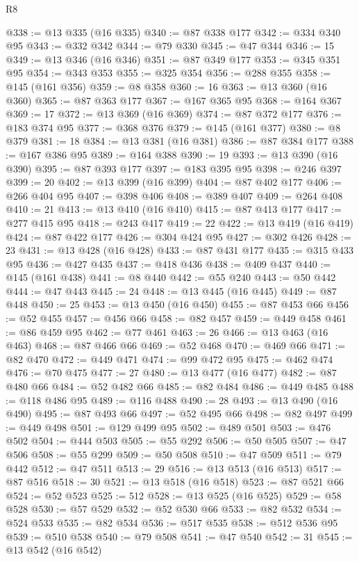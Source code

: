 \begin{lexlean}{R8}
\begin{coremodule}
@338 := @13 @335 (@16 @335)
@340 := @87 @338 @177
@342 := @334 @340 @95
@343 := @332 @342
@344 := @79 @330
@345 := @47 @344
@346 := 15
@349 := @13 @346 (@16 @346)
@351 := @87 @349 @177
@353 := @345 @351 @95
@354 := @343 @353
@355 := @325 @354
@356 := @288 @355
@358 := @145 (@161 @356)
@359 := @8 @358
@360 := 16
@363 := @13 @360 (@16 @360)
@365 := @87 @363 @177
@367 := @167 @365 @95
@368 := @164 @367
@369 := 17
@372 := @13 @369 (@16 @369)
@374 := @87 @372 @177
@376 := @183 @374 @95
@377 := @368 @376
@379 := @145 (@161 @377)
@380 := @8 @379
@381 := 18
@384 := @13 @381 (@16 @381)
@386 := @87 @384 @177
@388 := @167 @386 @95
@389 := @164 @388
@390 := 19
@393 := @13 @390 (@16 @390)
@395 := @87 @393 @177
@397 := @183 @395 @95
@398 := @246 @397
@399 := 20
@402 := @13 @399 (@16 @399)
@404 := @87 @402 @177
@406 := @266 @404 @95
@407 := @398 @406
@408 := @389 @407
@409 := @264 @408
@410 := 21
@413 := @13 @410 (@16 @410)
@415 := @87 @413 @177
@417 := @277 @415 @95
@418 := @243 @417
@419 := 22
@422 := @13 @419 (@16 @419)
@424 := @87 @422 @177
@426 := @304 @424 @95
@427 := @302 @426
@428 := 23
@431 := @13 @428 (@16 @428)
@433 := @87 @431 @177
@435 := @315 @433 @95
@436 := @427 @435
@437 := @418 @436
@438 := @409 @437
@440 := @145 (@161 @438)
@441 := @8 @440
@442 := @55 @240
@443 := @50 @442
@444 := @47 @443
@445 := 24
@448 := @13 @445 (@16 @445)
@449 := @87 @448
@450 := 25
@453 := @13 @450 (@16 @450)
@455 := @87 @453 @66
@456 := @52 @455
@457 := @456 @66
@458 := @82 @457
@459 := @449 @458
@461 := @86 @459 @95
@462 := @77 @461
@463 := 26
@466 := @13 @463 (@16 @463)
@468 := @87 @466 @66
@469 := @52 @468
@470 := @469 @66
@471 := @82 @470
@472 := @449 @471
@474 := @99 @472 @95
@475 := @462 @474
@476 := @70 @475
@477 := 27
@480 := @13 @477 (@16 @477)
@482 := @87 @480 @66
@484 := @52 @482 @66
@485 := @82 @484
@486 := @449 @485
@488 := @118 @486 @95
@489 := @116 @488
@490 := 28
@493 := @13 @490 (@16 @490)
@495 := @87 @493 @66
@497 := @52 @495 @66
@498 := @82 @497
@499 := @449 @498
@501 := @129 @499 @95
@502 := @489 @501
@503 := @476 @502
@504 := @444 @503
@505 := @55 @292
@506 := @50 @505
@507 := @47 @506
@508 := @55 @299
@509 := @50 @508
@510 := @47 @509
@511 := @79 @442
@512 := @47 @511
@513 := 29
@516 := @13 @513 (@16 @513)
@517 := @87 @516
@518 := 30
@521 := @13 @518 (@16 @518)
@523 := @87 @521 @66
@524 := @52 @523
@525 := 512
@528 := @13 @525 (@16 @525)
@529 := @58 @528
@530 := @57 @529
@532 := @52 @530 @66
@533 := @82 @532
@534 := @524 @533
@535 := @82 @534
@536 := @517 @535
@538 := @512 @536 @95
@539 := @510 @538
@540 := @79 @508
@541 := @47 @540
@542 := 31
@545 := @13 @542 (@16 @542)

\end{coremodule}
\end{lexlean}
